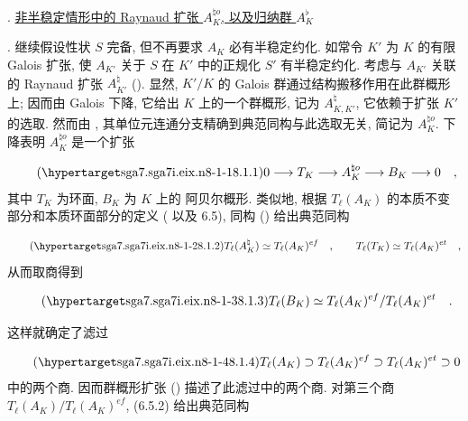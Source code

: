 

\medskip
{}. \underline{非半稳定情形中的 Raynaud 扩张 $A_K^{\natural o}$, 以及归纳群 $A_K^{\flat}$}

\medskip
\noindent
{}. 继续假设性状 $S$ 完备, 但不再要求 $A_K$ 必有半稳定约化. 如常令 $K'$ 为 $K$ 的有限 Galois 扩张, 使 $A_{K'}$ 关于 $S$ 在 $K'$ 中的正规化 $S'$ 有半稳定约化. 考虑与 $A_{K'}$ 关联的 Raynaud 扩张 $A_{K'}^{\natural}$ (). 显然, $K'/K$ 的 Galois 群通过结构搬移作用在此群概形上; 因而由 Galois 下降, 它给出 $K$ 上的一个群概形, 记为 $A_{K,K'}^{\natural}$, 它依赖于扩张 $K'$ 的选取. 然而由 , 其单位元连通分支精确到典范同构与此选取无关, 简记为 $A_K^{\natural o}$. 下降表明 $A_K^{\natural o}$ 是一个扩张

\begin{equation}\tag{\SGARefTarget{sga7.sga7i.eix.n8-1-1}{8.1.1}}
0 \longrightarrow T_K \longrightarrow A_K^{\natural o}
 \longrightarrow B_K \longrightarrow 0 \quad ,
\end{equation}
其中 $T_K$ 为环面, $B_K$ 为 $K$ 上的 阿贝尔概形. 类似地, 根据 $T_{\ell}(A_K)$ 的本质不变部分和本质环面部分的定义 ( 以及 6.5), 同构 () 给出典范同构

\begin{equation}\tag{\SGARefTarget{sga7.sga7i.eix.n8-1-2}{8.1.2}}
T_{\ell}(A_K^{\natural}) \simeq T_{\ell}(A_K)^{ef} \quad ,
\qquad T_{\ell}(T_K) \simeq T_{\ell}(A_K)^{et} \quad ,
\end{equation}
从而取商得到

\begin{equation}\tag{\SGARefTarget{sga7.sga7i.eix.n8-1-3}{8.1.3}}
T_{\ell}(B_K) \simeq
T_{\ell}(A_K)^{ef}/T_{\ell}(A_K)^{et} \quad .
\end{equation}

这样就确定了滤过

\begin{equation}\tag{\SGARefTarget{sga7.sga7i.eix.n8-1-4}{8.1.4}}
T_\ell(A_K) \supset T_\ell(A_K)^{ef}
 \supset T_\ell(A_K)^{et} \supset 0
\end{equation}
中的两个商. 因而群概形扩张 () 描述了此滤过中的两个商. 对第三个商 $T_\ell(A_K)/T_\ell(A_K)^{ef}$, (6.5.2) 给出典范同构

